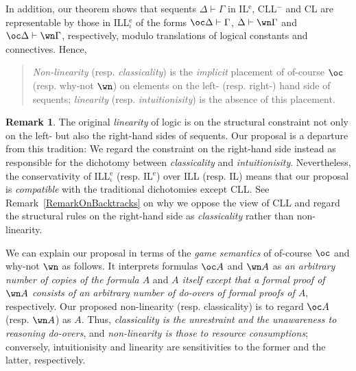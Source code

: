 \documentclass[a4paper]{article}
\theoremstyle{definition}
\newtheorem{remark}[definition]{Remark}
\theoremstyle{theorem}
\theoremstyle{remark}
\begin{document}
In addition, our theorem shows that sequents $\Delta \vdash \Gamma$ in IL$^{\text{e}}$, CLL$^-$ and CL are representable by those in ILL$^{\text{e}}_\iota$ of the forms $\oc \Delta \vdash \Gamma$, $\Delta \vdash \wn \Gamma$ and $\oc \Delta \vdash \wn \Gamma$, respectively, modulo translations of logical constants and connectives.
Hence,
\begin{quote}
\emph{Non-linearity} (resp. \emph{classicality}) is the \emph{implicit} placement of of-course $\oc$ (resp. why-not $\wn$) on elements on the left- (resp. right-) hand side of sequents; \emph{linearity} (resp. \emph{intuitionisity}) is the absence of this placement.
\end{quote}

\begin{remark}
\label{RemarkOnLinearity}
The original \emph{linearity} of logic \cite{girard1987linear} is on the structural constraint not only on the left- but also the right-hand sides of sequents.
Our proposal is a departure from this tradition: We regard the constraint on the right-hand side instead as responsible for the dichotomy between \emph{classicality} and \emph{intuitionisity}.
Nevertheless, the conservativity of ILL$^{\text{e}}_\iota$ (resp. IL$^{\text{e}}$) over ILL (resp. IL) means that our proposal is \emph{compatible} with the traditional dichotomies except CLL.
See Remark~\ref{RemarkOnBacktracks} on why we oppose the view of CLL and regard the structural rules on the right-hand side as \emph{classicality} rather than non-linearity.
\end{remark}

We can explain our proposal in terms of the \emph{game semantics} of of-course $\oc$ and why-not $\wn$ \cite{laurent2002polarized} as follows.
It interprets formulas $\oc A$ and $\wn A$ as \emph{an arbitrary number of copies of the formula $A$} and \emph{$A$ itself except that a formal proof of $\wn A$ consists of an arbitrary number of do-overs of formal proofs of $A$}, respectively.
Our proposed non-linearity (resp. classicality) is to regard $\oc A$ (resp. $\wn A$) as $A$.
Thus, \emph{classicality is the unrestraint and the unawareness to reasoning do-overs}, and \emph{non-linearity is those to resource consumptions}; conversely, intuitionisity and linearity are sensitivities to the former and the latter, respectively.
\end{document}
